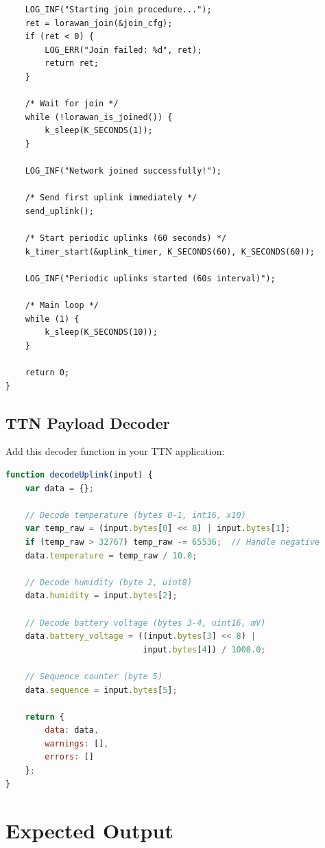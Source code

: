 \documentclass[11pt,a4paper]{article}
\begin{document}
\begin{solutionbox}
\begin{lstlisting}
    LOG_INF("Starting join procedure...");
    ret = lorawan_join(&join_cfg);
    if (ret < 0) {
        LOG_ERR("Join failed: %d", ret);
        return ret;
    }

    /* Wait for join */
    while (!lorawan_is_joined()) {
        k_sleep(K_SECONDS(1));
    }

    LOG_INF("Network joined successfully!");

    /* Send first uplink immediately */
    send_uplink();

    /* Start periodic uplinks (60 seconds) */
    k_timer_start(&uplink_timer, K_SECONDS(60), K_SECONDS(60));

    LOG_INF("Periodic uplinks started (60s interval)");

    /* Main loop */
    while (1) {
        k_sleep(K_SECONDS(10));
    }

    return 0;
}
\end{lstlisting}

\subsection{TTN Payload Decoder}

Add this decoder function in your TTN application:

\begin{lstlisting}[language=JavaScript]
function decodeUplink(input) {
    var data = {};

    // Decode temperature (bytes 0-1, int16, x10)
    var temp_raw = (input.bytes[0] << 8) | input.bytes[1];
    if (temp_raw > 32767) temp_raw -= 65536;  // Handle negative
    data.temperature = temp_raw / 10.0;

    // Decode humidity (byte 2, uint8)
    data.humidity = input.bytes[2];

    // Decode battery voltage (bytes 3-4, uint16, mV)
    data.battery_voltage = ((input.bytes[3] << 8) |
                            input.bytes[4]) / 1000.0;

    // Sequence counter (byte 5)
    data.sequence = input.bytes[5];

    return {
        data: data,
        warnings: [],
        errors: []
    };
}
\end{lstlisting}

\end{solutionbox}

\section{Expected Output}
\end{document}
